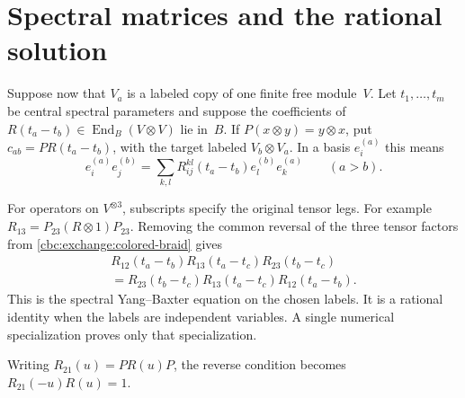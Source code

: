 \section{Spectral matrices and the rational solution}
Suppose now that $V_a$ is a labeled copy of one finite free module~$V$.
Let $t_1,\ldots,t_m$ be central spectral parameters and suppose the
coefficients of $R(t_a-t_b)\in\operatorname{End}_B(V\otimes V)$ lie in~$B$.
If $P(x\otimes y)=y\otimes x$, put
$c_{ab}=P R(t_a-t_b)$, with the target labeled $V_b\otimes V_a$.
In a basis $e_i^{(a)}$ this means
\[
 e_i^{(a)}e_j^{(b)}
 =\sum_{k,l}R_{ij}^{kl}(t_a-t_b)e_l^{(b)}e_k^{(a)}
 \qquad(a>b).
\]

For operators on $V^{\otimes3}$, subscripts specify the original tensor
legs.  For example $R_{13}=P_{23}(R\otimes1)P_{23}$.
Removing the common reversal of the three tensor factors from
\eqref{cbc:exchange:colored-braid} gives
\begin{equation}\label{cbc:exchange:spectral-ybe}
 \begin{split}
 R_{12}(t_a-t_b)R_{13}(t_a-t_c)R_{23}(t_b-t_c)\\
 =R_{23}(t_b-t_c)R_{13}(t_a-t_c)R_{12}(t_a-t_b).
 \end{split}
\end{equation}
This is the spectral Yang--Baxter equation on the chosen labels.
It is a rational identity when the labels are independent variables.
A single numerical specialization proves only that specialization.

Writing $R_{21}(u)=P R(u)P$, the reverse condition becomes
$R_{21}(-u)R(u)=1$.

